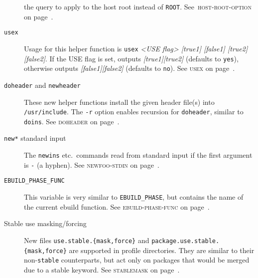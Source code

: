 \documentclass[a4paper,nofoldmark]{leaflet}
\newcommand{\code}[1]{\texttt{#1}}
\newcommand{\featureref}[1]{\textsc{#1} on page~\pageref{feat:#1}}
\begin{document}
\begin{description}
    the query to apply to the host root instead of \code{ROOT}.
    See~\featureref{host-root-option}.
    \item[\code{usex}] Usage for this helper function is
    \code{usex} \emph{<USE flag> [true1] [false1] [true2] [false2]}.
    If the USE flag is set, outputs \emph{[true1][true2]}
    (defaults to \code{yes}), otherwise outputs
    \emph{[false1][false2]} (defaults to \code{no}).
    See \featureref{usex}.
    \item[\code{doheader} and \code{newheader}] These new helper
    functions install the given header file(s) into
    \code{/usr/include}. The \code{-r} option enables recursion for
    \code{doheader}, similar to \code{doins}.
    See \featureref{doheader}.
    \item[\code{new*} standard input] The \code{newins} etc.\ commands
    read from standard input if the first argument is \code{-}
    (a hyphen).
    See \featureref{newfoo-stdin}.
    \item[\code{EBUILD\_PHASE\_FUNC}] This variable is very similar to
    \code{EBUILD\_PHASE}, but contains the name of the current ebuild
    function.
    See \featureref{ebuild-phase-func}.
    \item[Stable use masking/forcing] New files
    \code{use.stable.\allowbreak\{mask,force\}} and
    \code{package.use.stable.\allowbreak\{mask,force\}}
    are supported in profile directories.  They are similar to their
    non-\code{stable} counterparts, but act only on packages that
    would be merged due to a stable keyword.
    See \featureref{stablemask}.
\end{description}
\end{document}
